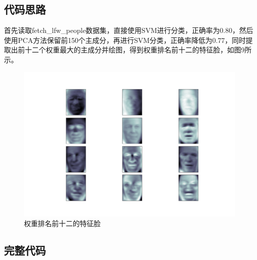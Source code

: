 \documentclass[12pt, a4paper, oneside, fontset=windows]{ctexart}
\begin{document}
\subsection{代码思路}
首先读取fetch\_lfw\_people数据集，直接使用SVM进行分类，正确率为0.80，然后使用PCA方法保留前150个主成分，再进行SVM分类，正确率降低为0.77，同时提取出前十二个权重最大的主成分并绘图，得到权重排名前十二的特征脸，如图9所示。
\begin{figure}[htbp]
    \centering
    \includegraphics[scale = 0.3]{feature_face_TOP12.png}
    \caption{权重排名前十二的特征脸}
\end{figure}
\newpage
\subsection{完整代码}

\end{document}
